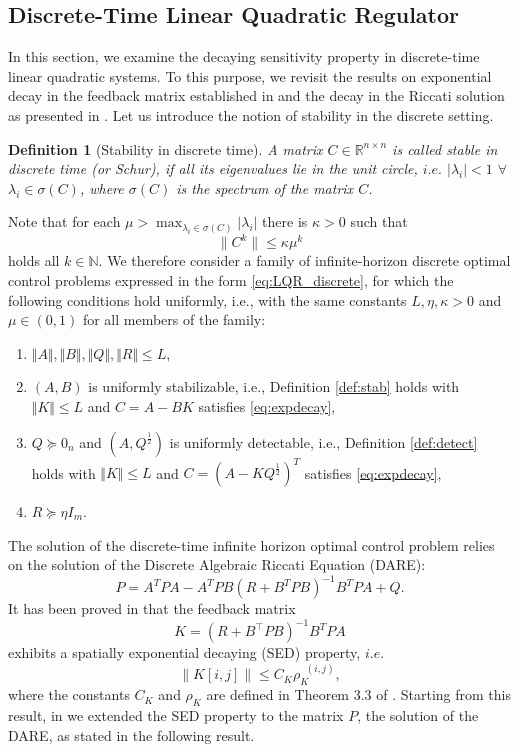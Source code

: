 \documentclass{article}
\DeclareMathOperator{\distG}{\operatorname{dist_\mathcal{G}}} %
\newtheorem{definition}{Definition}[section]
\begin{document}
\subsection{Discrete-Time Linear Quadratic Regulator}\label{sec:dislqr}

In this section, we examine the decaying sensitivity property in discrete-time linear quadratic systems. To this purpose, we revisit the results on exponential decay in the feedback matrix established in \cite{shin2022lqr} and the decay in the Riccati solution as presented in \cite{sperl2023separable}.
Let us introduce the notion of stability in the discrete setting.

\begin{definition}[Stability in discrete time]
    A matrix $C \in \mathbb{R}^{n \times n}$ is called stable in discrete time (or Schur), if all its eigenvalues lie in the unit circle, $i.e.$ $|\lambda_i| < 1$ $\forall$ $\lambda_i \in \sigma(C)$, where $\sigma(C)$ is the spectrum of the matrix $C$.
\end{definition}
Note that for each $\mu>\max_{\lambda_i\in\sigma(C)}|\lambda_i|$ there is $\kappa>0$ such that
\begin{equation} \|C^k\| \le \kappa \mu^k\label{eq:expdecay}\end{equation}
holds all $k\in\mathbb{N}$.
We therefore consider a family of infinite-horizon discrete optimal control problems expressed in the form \eqref{eq:LQR_discrete}, for which the following conditions hold uniformly, i.e., with the same constants $L,\eta, \kappa >0$ and $\mu\in(0,1)$ for all members of the family:
\begin{enumerate}[label=\roman*)]
\item  $\Vert A \Vert,\Vert B \Vert,\Vert Q \Vert,\Vert R \Vert \le L$,
    \item $(A,B)$ is uniformly stabilizable, i.e., Definition \ref{def:stab} holds with $\Vert K \Vert \le L$ and $C=A-BK$ satisfies \eqref{eq:expdecay}, 
    \item $  Q\succeq 0_n$ and $(A, Q^{\frac{1}{2}})$ is uniformly detectable, i.e., Definition \ref{def:detect} holds with $\Vert K \Vert \le L$ and $C=(A-KQ^{\frac{1}{2}})^T$ satisfies \eqref{eq:expdecay}, 
    \item  $R\succeq \eta I_m$.
\end{enumerate}
The solution of the discrete-time infinite horizon optimal control problem relies on the solution of the Discrete Algebraic Riccati Equation (DARE):
\begin{equation}
P=A^{T}PA-A^{T}PB\left(R+B^{T}PB\right)^{-1}B^{T}PA+Q.
\label{eq_dare}
\end{equation}
It has been proved in \cite{shin2022lqr} that the feedback matrix 
\begin{equation*}
    K = (R+B^\top P B)^{-1} B^T P A
\end{equation*}
exhibits a spatially exponential decaying (SED) property, 
$i.e.$
$$
\|K[i,j]\| \le C_K \rho_K^{\distG(i,j)},
$$
where the constants $C_K$ and $\rho_K$ are defined in Theorem 3.3 of \cite{shin2022lqr}. Starting from this result, in \cite{sperl2023separable} we %
extended the SED property to the matrix $P$, the solution of the DARE, as stated in the following result.
\end{document}
